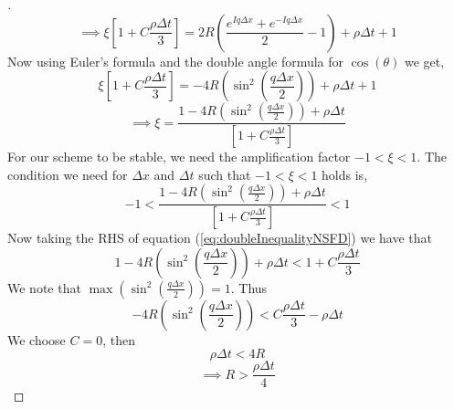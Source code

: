 \documentclass[a4paper]{article}
\begin{document}
\begin{proof}[]
        \begin{equation*}
             \implies \xi [1 + C\frac{\rho \Delta t}{3}] = 2R(\frac{e^{Iq\Delta x} + e^{-Iq\Delta x}}{2} - 1) + \rho \Delta t + 1
        \end{equation*}
        Now using Euler's formula and the double angle formula for $\cos(\theta)$ we get,
        \begin{equation*}
            \xi [1 + C\frac{\rho \Delta t}{3}] = - 4R(\sin^{2}(\frac{q\Delta x}{2}) ) + \rho \Delta t + 1
        \end{equation*}
        \begin{equation*}
            \implies \xi  = \frac{ 1 - 4R(\sin^{2}(\frac{q\Delta x}{2}) ) + \rho \Delta t}{[1 + C\frac{\rho \Delta t}{3}]}
        \end{equation*}
	    For our scheme to be stable, we need  the amplification factor $-1<\xi<1$. The condition we need for $\Delta x $ and $ \Delta t$ such that $-1<\xi<1$ holds is,
	    \begin{equation}\label{eq:doubleInequalityNSFD}
	        -1 <  \frac{ 1 - 4R(\sin^{2}(\frac{q\Delta x}{2}) ) + \rho \Delta t}{[1 + C\frac{\rho \Delta t}{3}]} < 1
	    \end{equation}
		Now taking the RHS of equation (\ref{eq:doubleInequalityNSFD}) we have that 
	    \begin{equation*}
             1 - 4R(\sin^{2}(\frac{q\Delta x}{2}) ) + \rho \Delta t < 1 + C\frac{\rho \Delta t}{3}
	    \end{equation*}
	    We note that $\max(\sin^{2}(\frac{q\Delta x}{2})) = 1$. Thus 
	     \begin{equation*}
	       - 4R(\sin^{2}(\frac{q\Delta x}{2}) ) <  C\frac{\rho \Delta t}{3} - \rho \Delta t 
	     \end{equation*}
	     We choose $C=0$, then
	     \begin{equation*}
	         \rho\Delta t < 4R
	     \end{equation*}
	     \begin{equation*}
	         \implies R >\frac{\rho\Delta t}{4}
	     \end{equation*}
	     

\end{proof}
\end{document}
